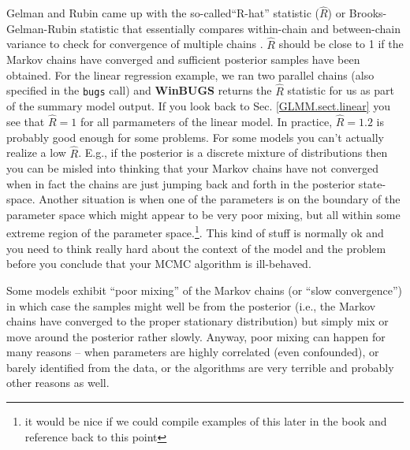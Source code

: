 Gelman and Rubin came up with the so-called``R-hat''
statistic ($\hat{R}$) or Brooks-Gelman-Rubin statistic that
essentially compares within-chain and between-chain variance to check
for convergence of multiple chains \citep{gelman_etal:1996}. $\hat{R}$
should be close to 1 if the Markov chains have converged and
sufficient posterior samples have been obtained. For the linear regression example, we ran two parallel chains (also specified in the {\tt bugs} call) and {\bf WinBUGS} returns the $\hat{R}$ statistic for us as part of the summary model output. If you look back to Sec. \ref{GLMM.sect.linear} you see that $\hat{R} = 1$ for all parmameters of the linear model.
In practice, $\hat{R}
= 1.2$ is probably good enough for some problems.  For some models you
can't actually realize a low $\hat{R}$. E.g., if the posterior is a
discrete mixture of distributions then you can be misled into thinking
that your Markov chains have not converged when in fact the chains are
just jumping back and forth in the posterior state-space.
Another situation is when one of the parameters is on the boundary of
the parameter space which might appear to be very poor mixing, but all
within some extreme region of the parameter space.\footnote{it would
  be nice if we could compile examples of this later in the book and
  reference back to this point}.
This
kind of stuff is normally ok and you need to think really hard about
the context of the model and the problem before you conclude that your
MCMC algorithm is ill-behaved.

Some models exhibit ``poor mixing'' of the Markov chains (or ``slow
convergence'') in which case the samples might well be from the
posterior (i.e., the Markov chains have converged to the proper
stationary distribution) but simply mix or move around the posterior
rather slowly. Anyway, poor mixing can happen for many reasons -- when
parameters are highly correlated (even confounded), or barely
identified from the data, or the algorithms are very terrible and
probably other reasons as well.


